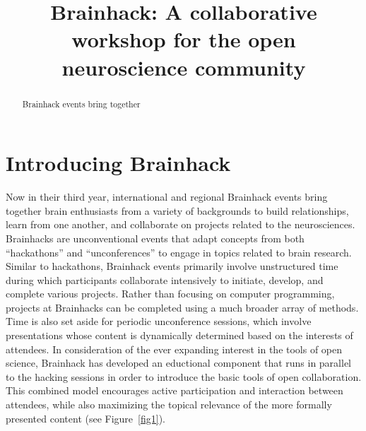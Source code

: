 \documentclass[11pt]{bmc_article_s50}
\begin{document}

\title{Brainhack: A collaborative workshop for the open neuroscience community}
\maketitle


\begin{abstract} %
Brainhack events bring together 

\end{abstract}


\section{Introducing Brainhack}

Now in their third year, international and regional Brainhack events bring together brain enthusiasts from a variety of backgrounds to build relationships, learn from one another, and collaborate on projects related to the neurosciences. Brainhacks are unconventional events that adapt concepts from both ``hackathons'' and ``unconferences'' to engage in topics related to brain research. Similar to hackathons, Brainhack events primarily involve unstructured time during which participants collaborate intensively to initiate, develop, and complete various projects. Rather than focusing on computer programming, projects at Brainhacks can be completed using a much broader array of methods. Time is also set aside for periodic unconference sessions, which involve presentations whose content is dynamically determined based on the interests of attendees. In consideration of the ever expanding interest in the tools of open science, Brainhack has developed an eductional component that runs in parallel to the hacking sessions in order to introduce the basic tools of open collaboration. This combined model encourages active participation and interaction between attendees, while also maximizing the topical relevance of the more formally presented content (see Figure~\ref{fig1}).
\end{document}
